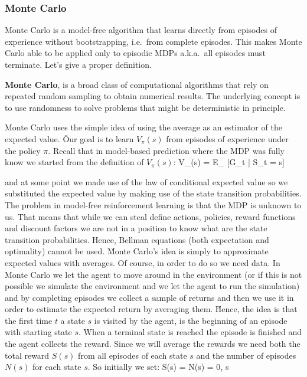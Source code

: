 \subsubsection{Monte Carlo}

Monte Carlo is a model-free algorithm that learns directly from episodes of experience without bootstrapping, i.e.\
from complete episodes. This makes Monte Carlo able to be applied only to episodic MDPs a.k.a.\ all episodes must
terminate. Let's give a proper definition.

\textbf{Monte Carlo}, is a broad class of computational algorithms that rely on repeated random sampling to obtain
numerical results. The underlying concept is to use randomness to solve problems that might be deterministic in
principle.
\ed

Monte Carlo uses the simple idea of using the average as an estimator of the expected value. \v

Our goal is to learn $V_\pi(s)$ from episodes of experience under the policy $\pi$. Recall that in model-based
prediction where the MDP was fully know we started from the definition of $V_\pi(s)$:
\bse
V_{\pi}(s) = E_{\pi} [G_t | S_t = s]
\ese

and at some point we made use of the law of conditional expected value so we substituted the expected value by making
use of the state transition probabilities. The problem in model-free reinforcement learning is that the MDP is
unknown to us. That means that while we can steal define actions, policies, reward functions and discount factors we
are not in a position to know what are the state transition probabilities. Hence, Bellman equations (both expectation
and optimality) cannot be used. \v

Monte Carlo's idea is simply to approximate expected values with averages. Of course, in order to do so we need data.
In Monte Carlo we let the agent to move around in the environment (or if this is not possible we simulate the
environment and we let the agent to run the simulation) and by completing episodes we collect a sample of returns and
then we use it in order to estimate the expected return by averaging them. \v

Hence, the idea is that the first time $t$ a state $s$ is visited by the agent, is the beginning of an episode with
starting state $s$. When a terminal state is reached the episode is finished and the agent collects the reward. Since
we will average the rewards we need both the total reward $S(s)$ from all episodes of each state $s$ and the number
of episodes $N(s)$ for each state $s$. So initially we set:
\bse
S(s) = N(s) = 0, \:\: \forall s
\ese

